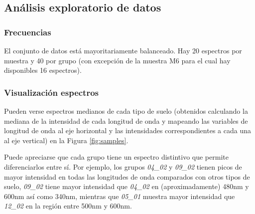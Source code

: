 \documentclass[12pt]{article}
\begin{document}
\subsection{Análisis exploratorio de datos}
\subsubsection{Frecuencias}

El conjunto de datos está mayoritariamente balanceado. Hay 20 espectros por muestra y 40 por grupo (con excepción de la muestra M6 para el cual hay disponibles 16 espectros). 


\subsubsection{Visualización espectros}

Pueden verse espectros medianos de cada tipo de suelo (obtenidos calculando la mediana de la intensidad de cada longitud de onda y mapeando las variables de longitud de onda al eje horizontal y las intensidades correspondientes a cada una al eje vertical) en la Figura \ref{fig:samples}. 

Puede apreciarse que cada grupo tiene un espectro distintivo que permite diferenciarlos entre sí. Por ejemplo, los grupos \textit{04\_02} y \textit{09\_02} tienen picos de mayor intensidad en todas las longitudes de onda comparados con otros tipos de suelo, \textit{09\_02} tiene mayor intensidad que \textit{04\_02} en (aproximadamente) 480nm y 600nm así como 340nm, mientras que \textit{05\_01} muestra mayor intensidad que \textit{12\_02} en la región entre 500nm y 600nm.
\end{document}
